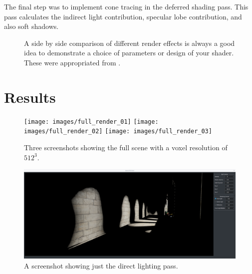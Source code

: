 \documentclass[]{acmsiggraph}
\begin{document}
The final step was to implement cone tracing in the deferred shading pass. This pass calculates the indirect light contribution, specular lobe contribution, and also soft shadows.


\begin{figure}[htbp]
  \centering
 \hfill
 \caption{A side by side comparison of different render effects is always a good idea to demonstrate a choice of parameters or design of your shader. These were appropriated from \cite{Villegas2016}.}
\end{figure}

\section{Results}

\begin{figure}[htbp]\centering
 \texttt{[image: images/full\_render\_01]}
 \texttt{[image: images/full\_render\_02]}
 \texttt{[image: images/full\_render\_03]}
 \caption{\label{fig:reference}Three screenshots showing the full scene with a voxel resolution of $512^3$.}
\end{figure}

\begin{figure}[htbp]\centering
 \includegraphics[width=1.0\linewidth]{images/direct_only}
 \caption{A screenshot showing just the direct lighting pass.}
\end{figure}
\end{document}
